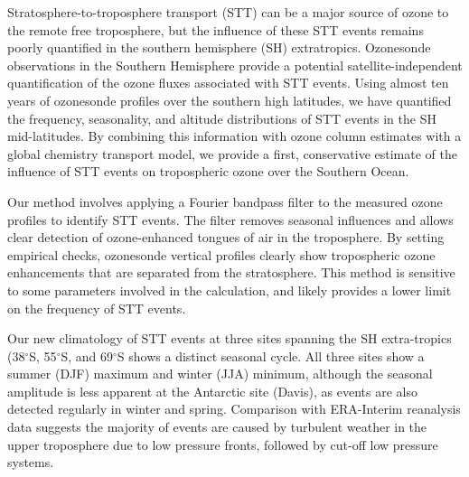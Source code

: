   
  
Stratosphere-to-troposphere transport (STT) can be a major source of ozone to the remote free troposphere, but the influence of these STT events remains poorly quantified in the southern hemisphere (SH) extratropics.
Ozonesonde observations in the Southern Hemisphere provide a potential satellite-independent quantification of the ozone fluxes associated with STT events.
Using almost ten years of ozonesonde profiles over the southern high latitudes, we have quantified the frequency, seasonality, and altitude distributions of STT events in the SH mid-latitudes. 
By combining this information with ozone column estimates with a global chemistry transport model, we provide a first, conservative estimate of the influence of STT events on tropospheric ozone over the Southern Ocean.


Our method involves applying a Fourier bandpass filter to the measured ozone profiles to identify STT events.
The filter removes seasonal influences and allows clear detection of ozone-enhanced tongues of air in the troposphere.
By setting empirical checks, ozonesonde vertical profiles clearly show tropospheric ozone enhancements that are separated from the stratosphere.
This method is sensitive to some parameters involved in the calculation, and likely provides a lower limit on the frequency of STT events.%

Our new climatology of STT events at three sites spanning the SH extra-tropics (38$^{\circ}$S, 55$^{\circ}$S, and 69$^{\circ}$S shows a distinct seasonal cycle.
All three sites show a summer (DJF) maximum and winter (JJA) minimum, although the seasonal amplitude is less apparent at the Antarctic site (Davis), as events are also detected regularly in winter and spring.  %
Comparison with ERA-Interim reanalysis data suggests the majority of events are caused by turbulent weather in the upper troposphere due to low pressure fronts, followed by cut-off low pressure systems.


